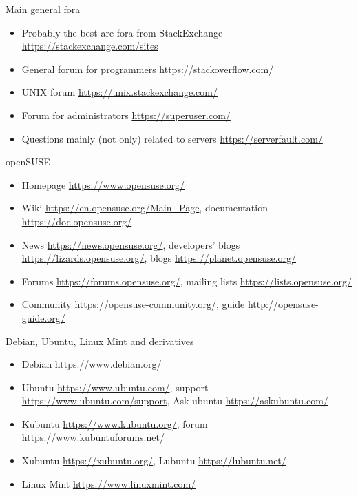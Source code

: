 \documentclass[compress, ucs, xelatex, 11pt, xcolor=svgnames,
  hyperref={
    bookmarks=true,
    unicode=true,
    colorlinks=true,
    pdftitle={Linux, command line and MetaCentrum},
    plainpages=false,
    pdfauthor={Vojtech Zeisek},
    pdfsubject={Course about use of Linux command line, writing shell scripts and using MetaCentrum of CESNET},
    pdfcreator={XeLaTeX},
    pdfkeywords={Linux, GNU, BASH, shell, command line, MetaCentrum},
    linkcolor=DarkRed,
    anchorcolor=DarkBlue,
    citecolor=Indigo,
    filecolor=NavyBlue,
    menucolor=DarkMagenta,
    urlcolor=DarkBlue,
    pdftex},
  url={hyphens, lowtilde} %
  ]{beamer}
\begin{document}
\begin{frame}{Main general fora}
  \begin{itemize}
    \item Probably the best are fora from StackExchange \url{https://stackexchange.com/sites}
    \item General forum for programmers \url{https://stackoverflow.com/}
    \item UNIX forum \url{https://unix.stackexchange.com/}
    \item Forum for administrators \url{https://superuser.com/}
    \item Questions mainly (not only) related to servers \url{https://serverfault.com/}
  \end{itemize}
\end{frame}

\begin{frame}{openSUSE}
  \begin{itemize}
    \item Homepage \url{https://www.opensuse.org/}
    \item Wiki \url{https://en.opensuse.org/Main_Page}, documentation \url{https://doc.opensuse.org/}
    \item News \url{https://news.opensuse.org/}, developers' blogs \url{https://lizards.opensuse.org/}, blogs \url{https://planet.opensuse.org/}
    \item Forums \url{https://forums.opensuse.org/}, mailing lists \url{https://lists.opensuse.org/}
    \item Community \url{https://opensuse-community.org/}, guide \url{http://opensuse-guide.org/}
  \end{itemize}
\end{frame}

\begin{frame}{Debian, Ubuntu, Linux Mint and derivatives}
  \begin{itemize}
    \item Debian \url{https://www.debian.org/}
    \item Ubuntu \url{https://www.ubuntu.com/}, support \url{https://www.ubuntu.com/support}, Ask ubuntu \url{https://askubuntu.com/}
    \item Kubuntu \url{https://www.kubuntu.org/}, forum \url{https://www.kubuntuforums.net/}
    \item Xubuntu \url{https://xubuntu.org/}, Lubuntu \url{https://lubuntu.net/}
    \item Linux Mint \url{https://www.linuxmint.com/}
  \end{itemize}
\end{frame}
\end{document}
